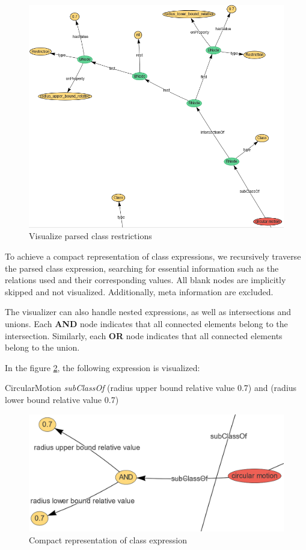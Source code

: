 \begin{figure}[H]
    \includegraphics[scale=0.5]{Graphics/OwlVisualizer/graphProcessing2.png}
    \centering
    \caption{Visualize parsed class restrictions}
    \label{fig:graphProcessing2}
\end{figure}

To achieve a compact representation of class expressions, we recursively traverse the parsed class expression, 
searching for essential information such as the relations used and their corresponding values. 
All blank nodes are implicitly skipped and not visualized. Additionally, meta information are excluded.

The visualizer can also handle nested expressions, as well as intersections and unions. Each \textbf{AND} node indicates that all connected elements belong to the intersection.
Similarly, each \textbf{OR} node indicates that all connected elements belong to the union.

In the figure \ref{fig:graphProcessing3}, the following expression is visualized:

CircularMotion \textit{subClassOf} (radius upper bound relative value 0.7) and (radius lower bound relative value 0.7)

\begin{figure}[H]
    \includegraphics[scale=0.3]{Graphics/OwlVisualizer/graphProcessing3.png}
    \centering
    \caption{Compact representation of class expression}
    \label{fig:graphProcessing3}
\end{figure}

